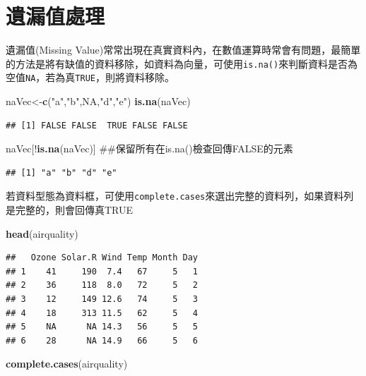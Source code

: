 \documentclass[]{book}
\newenvironment{Shaded}{\begin{snugshade}}{\end{snugshade}}
\newcommand{\KeywordTok}[1]{\textcolor[rgb]{0.13,0.29,0.53}{\textbf{{#1}}}}
\newcommand{\StringTok}[1]{\textcolor[rgb]{0.31,0.60,0.02}{{#1}}}
\newcommand{\OtherTok}[1]{\textcolor[rgb]{0.56,0.35,0.01}{{#1}}}
\newcommand{\NormalTok}[1]{{#1}}
\theoremstyle{definition}
\theoremstyle{definition}
\theoremstyle{remark}
\begin{document}
\section{遺漏值處理}

遺漏值(Missing
Value)常常出現在真實資料內，在數值運算時常會有問題，最簡單的方法是將有缺值的資料移除，如資料為向量，可使用\texttt{is.na()}來判斷資料是否為空值\texttt{NA}，若為真\texttt{TRUE}，則將資料移除。

\begin{Shaded}
\begin{Highlighting}[]
\NormalTok{naVec<-}\KeywordTok{c}\NormalTok{(}\StringTok{"a"}\NormalTok{,}\StringTok{"b"}\NormalTok{,}\OtherTok{NA}\NormalTok{,}\StringTok{"d"}\NormalTok{,}\StringTok{"e"}\NormalTok{)}
\KeywordTok{is.na}\NormalTok{(naVec)}
\end{Highlighting}
\end{Shaded}

\begin{verbatim}
## [1] FALSE FALSE  TRUE FALSE FALSE
\end{verbatim}

\begin{Shaded}
\begin{Highlighting}[]
\NormalTok{naVec[!}\KeywordTok{is.na}\NormalTok{(naVec)] ##保留所有在is.na()檢查回傳FALSE的元素}
\end{Highlighting}
\end{Shaded}

\begin{verbatim}
## [1] "a" "b" "d" "e"
\end{verbatim}

若資料型態為資料框，可使用\texttt{complete.cases}來選出完整的資料列，如果資料列是完整的，則會回傳真TRUE

\begin{Shaded}
\begin{Highlighting}[]
\KeywordTok{head}\NormalTok{(airquality)}
\end{Highlighting}
\end{Shaded}

\begin{verbatim}
##   Ozone Solar.R Wind Temp Month Day
## 1    41     190  7.4   67     5   1
## 2    36     118  8.0   72     5   2
## 3    12     149 12.6   74     5   3
## 4    18     313 11.5   62     5   4
## 5    NA      NA 14.3   56     5   5
## 6    28      NA 14.9   66     5   6
\end{verbatim}

\begin{Shaded}
\begin{Highlighting}[]
\KeywordTok{complete.cases}\NormalTok{(airquality) }
\end{Highlighting}
\end{Shaded}
\end{document}
